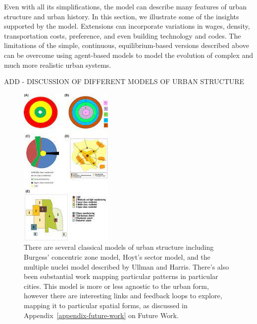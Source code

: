 Even with all its simplifications, the model can describe many features of urban structure and urban history. In this section, we illustrate some of the insights supported by the model. Extensions can incorporate variations in wages, density, transportation costs, preference, and even building technology and codes. The limitations of the simple, continuous, equilibrium-based versions described above can be overcome using agent-based models to model the evolution of complex and much more realistic urban systems. 


ADD - DISCUSSION OF DIFFERENT MODELS OF URBAN STRUCTURE %
\begin{figure}
    \centering
    \includegraphics{fig/urban-structure.jpeg}
    \caption[Classical models of urban structure.]{There are several classical models of urban structure including Burgess' concentric zone model, Hoyt's sector model, and the multiple nuclei model described by Ullman and Harris. There's also been substantial work mapping particular patterns in particular cities. This model is more or less agnostic to the urban form, however there are interesting links and feedback loops to explore, mapping it to particular spatial forms, as discussed in Appendix~\ref{appendix-future-work} on Future Work.}
    \label{fig-urban-structure}
\end{figure}

